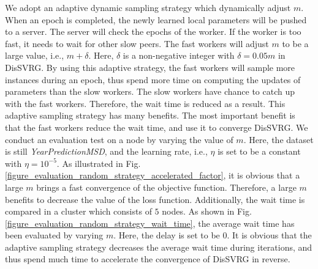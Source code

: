 \documentclass[preprint,review,11pt,a4paper]{elsarticle}
\begin{document}
We adopt an adaptive dynamic sampling strategy which dynamically adjust $m$. When an epoch is completed, the newly learned local parameters will be pushed to a server. The server will check the epochs of the worker. If the worker is too fast, it needs to wait for other slow peers.  The fast workers will adjust  $m$ to be a large value, i.e., $m+\delta$. Here, $\delta$ is a non-negative integer with $\delta=0.05m$ in DisSVRG. By using this adaptive strategy, the fast workers will sample more instances during an epoch, thus spend more time on computing the updates of parameters than the slow workers. The slow workers have chance to catch up with the fast workers. Therefore, the wait time is reduced as a result. This adaptive sampling strategy has many benefits. The most important benefit is that the fast workers reduce the wait time, and use it  to converge DisSVRG. We conduct an evaluation test on a  node by varying the value of $m$. Here, the dataset is still \emph{YearPredictionMSD}, and the learning rate, i.e., $\eta$ is set to be a constant with $\eta=10^{-5}$. As illustrated in Fig. \ref{figure_evaluation_random_strategy_accelerated_factor},  it is obvious that a large $m$ brings a fast convergence of the objective function. Therefore, a large $m$ benefits to decrease the value of the loss function. Additionally, the wait time is compared in a cluster which consists of $5$ nodes.   As shown in Fig. \ref{figure_evaluation_random_strategy_wait_time}, the average wait time has been evaluated by varying $m$. Here, the delay is set to be $0$.  It is obvious that the adaptive sampling strategy  decreases the average wait time during iterations, and thus spend much time to accelerate the convergence of DisSVRG in reverse.
\end{document}
